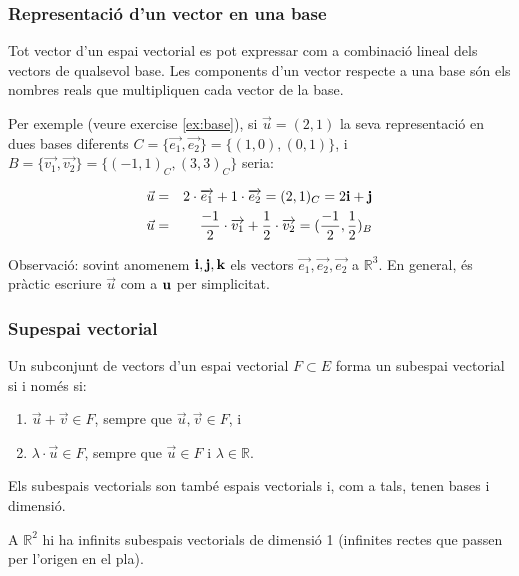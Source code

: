 \documentclass{beamer}
\begin{document}
\begin{frame}
  \frametitle{Representació d'un vector en una base}

    Tot vector d'un espai vectorial es pot expressar com a combinació lineal dels vectors de qualsevol base. Les components d'un vector respecte a una base són els nombres reals que multipliquen cada vector de la base.

    Per exemple (veure exercise \ref{ex:base}), si $\overrightarrow{u}=(2,1)$ la seva representació en dues bases diferents $C=\{\overrightarrow{e_1},\overrightarrow{e_2}\}=\{(1,0),(0,1)\}$, i $B=\{\overrightarrow{v_1},\overrightarrow{v_2}\}=\{(-1,1)_C,(3,3)_C\}$ seria:

    \begin{eqnarray*}
      \vec{u}&=&2\cdot \overrightarrow{e_1}+ 1 \cdot \overrightarrow{e_2}=(2,1)_C=2\textbf{i}+\textbf{j} \\
      \vec{u}&=&\frac{-1}{2}\cdot \overrightarrow{v_1}+ \frac{1}{2} \cdot \overrightarrow{v_2}=(\frac{-1}{2},\frac{1}{2})_B
    \end{eqnarray*}

    Observació: sovint anomenem $\textbf{i},\textbf{j},\textbf{k}$ els vectors $\overrightarrow{e_1},\overrightarrow{e_2},\overrightarrow{e_2}$ a $\mathbb{R}^3$. En general, és pràctic escriure $\vec{u}$ com a $\textbf{u}$ per simplicitat.
\end{frame}
\begin{frame}
  \frametitle{Supespai vectorial}
  \begin{definicio}
    Un subconjunt de vectors d'un espai vectorial $F \subset E$ forma un subespai vectorial si i només si:
    \begin{enumerate}
      \item $\vec{u}+\vec{v} \in F$, sempre que $\vec{u},\vec{v} \in F$, i
      \item $\lambda \cdot \vec{u} \in F$, sempre que $\vec{u} \in F$ i $\lambda \in \mathbb{R}$.
    \end{enumerate}
  \end{definicio}
  Els subespais vectorials son també espais vectorials i, com a tals, tenen bases i dimensió.

A $\mathbb{R}^2$ hi ha infinits subespais vectorials de dimensió 1 (infinites rectes que passen per l'origen en el pla).
\end{frame}
\end{document}
